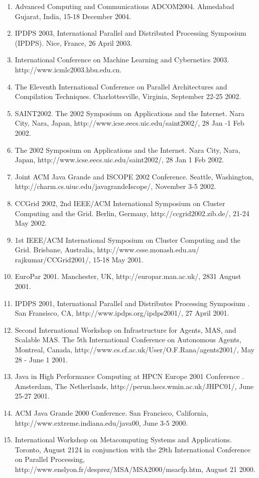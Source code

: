 \documentclass{article}
\begin{document}
\begin{enumerate}
\item  Advanced Computing and Communications ADCOM2004. Ahmedabad Gujarat, India, 15-18 December 2004. 
\item  IPDPS 2003, International Parallel and Distributed Processing Symposium (IPDPS). Nice, France, 26 April 2003. 
\item  International Conference on Machine Learning and Cybernetics 2003. http://www.icmlc2003.hbu.edu.cn. 
\item  The Eleventh International Conference on Parallel Architectures and Compilation Techniques. Charlottesville, Virginia, September 22-25 2002. 
\item  SAINT2002. The 2002 Symposium on Applications and the Internet. Nara City, Nara, Japan, http://www.icse.eecs.uic.edu/saint2002/, 28 Jan -1 Feb 2002. 
\item  The 2002 Symposium on Applications and the Internet. Nara City, Nara, Japan, http://www.icse.eecs.uic.edu/saint2002/, 28 Jan 1 Feb 2002. 
\item  Joint ACM Java Grande and ISCOPE 2002 Conference. Seattle, Washington, http://charm.cs.uiuc.edu/javagrandeIscope/, November 3-5 2002. 
\item  CCGrid 2002, 2nd IEEE/ACM International Symposium on Cluster Computing and the Grid. Berlin, Germany, http://ccgrid2002.zib.de/, 21-24 May 2002. 
\item  1st IEEE/ACM International Symposium on Cluster Computing and the Grid. Brisbane, Australia, http://www.csse.monash.edu.au/ rajkumar/CCGrid2001/, 15-18 May 2001. 
\item  EuroPar 2001. Manchester, UK, http://europar.man.ac.uk/, 2831 August 2001. 
\item  IPDPS 2001, International Parallel and Distributes Processing Symposium . San Fransisco, CA, http://www.ipdps.org/ipdps2001/, 27 April 2001. 
\item  Second International Workshop on Infrastructure for Agents, MAS, and Scalable MAS. The 5th International Conference on Autonomous Agents, Montreal, Canada, http://www.cs.cf.ac.uk/User/O.F.Rana/agents2001/, May 28 - June 1 2001. 
\item  Java in High Performance Computing at HPCN Europe 2001 Conference . Amsterdam, The Netherlands, http://perun.hscs.wmin.ac.uk/JHPC01/, June 25-27 2001. 
\item  ACM Java Grande 2000 Conference. San Francisco, California, http://www.extreme.indiana.edu/java00, June 3-5 2000. 
\item  International Workshop on Metacomputing Systems and Applications. Toronto, August 2124  in conjunction with the 29th International Conference on Parallel Processing, http://www.enslyon.fr/desprez/MSA/MSA2000/msacfp.htm, August 21 2000. 

\end{enumerate}
\end{document}
